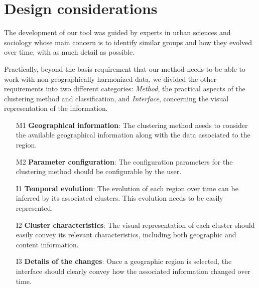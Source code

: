 \section{Design considerations}
The development of our tool was guided by experts in urban sciences and
sociology whose main concern is to identify similar groups and how they evolved
over time, with as much detail as possible.


Practically, beyond the basis requirement that our method needs to be able to
work with non-geographically harmonized data, we divided the other requirements
into two different categories: \textit{Method}, the practical aspects of the
clustering method and classification, and \textit{Interface}, concerning the
visual representation of the information.

\begin{enumerate}
    \item[M1]{\textbf{Geographical information}: The clustering method needs to
    consider the available geographical information along with the data
    associated to the region.}

    \item[M2]{\textbf{Parameter configuration}: The configuration parameters for
    the clustering method should be configurable by the user.}

    \item[I1]{\textbf{Temporal evolution}: The evolution of each region over
    time can be inferred by its associated clusters. This evolution needs to be
    easily represented. }

    \item[I2]{\textbf{Cluster characteristics}:  The visual representation of
    each cluster should easily convey its relevant characteristics, including
    both geographic and content information.}

    \item[I3]{\textbf{Details of the changes}: Once a geographic region is
    selected, the interface should clearly convey how the associated information
    changed over time.}
\end{enumerate}
